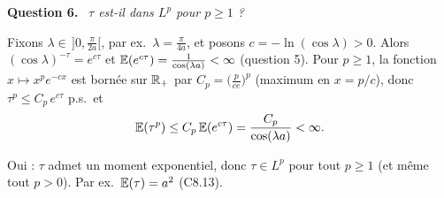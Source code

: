 \documentclass[11pt,a4paper]{article}
\newcommand{\question}[1]{\par\medskip\noindent\textbf{Question #1.}~}
\begin{document}
\begin{exo}[{Martingale trigonométrique et sortie de $]
\question{6} \emph{$\tau$ est-il dans $L^p$ pour $p\ge1$ ?}

Fixons $\lambda\in\,]0,\frac\pi{2a}[$, par ex.\ $\lambda=\frac\pi{4a}$, et posons $c=-\ln(\cos\lambda)>0$. Alors
$(\cos\lambda)^{-\tau}=e^{c\tau}$ et $\mathbb{E}(e^{c\tau})=\frac1{\cos(\lambda a)}<\infty$ (question 5). Pour $p\ge1$, la fonction
$x\mapsto x^pe^{-cx}$ est bornée sur $\mathbb{R}_+$ par $C_p=\bigl(\frac p{ce}\bigr)^p$ (maximum en $x=p/c$), donc $\tau^p\le C_p\,e^{c\tau}$ p.s.\ et
\[\mathbb{E}(\tau^p)\le C_p\,\mathbb{E}(e^{c\tau})=\frac{C_p}{\cos(\lambda a)}<\infty.\]
\begin{resultat}
Oui : $\tau$ admet un moment exponentiel, donc $\tau\in L^p$ pour tout $p\ge1$ (et même tout $p>0$). Par ex.\ $\mathbb{E}(\tau)=a^2$ (C8.13).
\end{resultat}
\end{exo}
\end{document}
